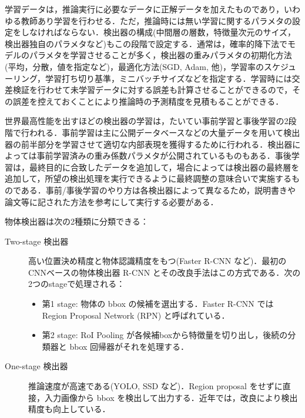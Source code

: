 \documentclass[originalpaper,fleqn]{jsaiart}     %
\begin{document}
学習データは，推論実行に必要なデータに正解データを加えたものであり，いわゆる教師あり学習を行わせる．ただ，推論時には無い学習に関するパラメタの設定をしなければならない．検出器の構成(中間層の層数，特徴量次元のサイズ，検出器独自のパラメタなど)もこの段階で設定する．通常は，確率的降下法でモデルのパラメタを学習させることが多く，検出器の重みパラメタの初期化方法(平均，分散，値を指定など)，最適化方法(SGD, Adam, 他)，学習率のスケジューリング，学習打ち切り基準，ミニバッチサイズなどを指定する．学習時には交差検証を行わせて未学習データに対する誤差も計算させることができるので，その誤差を控えておくことにより推論時の予測精度を見積もることができる．

世界最高性能を出すほどの検出器の学習は，たいてい事前学習と事後学習の2段階で行われる．事前学習は主に公開データベースなどの大量データを用いて検出器の前半部分を学習させて適切な内部表現を獲得するために行われる．検出器によっては事前学習済みの重み係数パラメタが公開されているものもある．事後学習は，最終目的に合致したデータを追加して，場合によっては検出器の最終層を追加して，所望の検出処理を実行できるように最終調整の意味合いで実施するものである．事前/事後学習のやり方は各検出器によって異なるため，説明書きや論文等に記された方法を参考にして実行する必要がある．

物体検出器は次の2種類に分類できる\cite{JZLYLFQ19}：
\begin{description}
    \item[Two-stage 検出器] 高い位置決め精度と物体認識精度をもつ(Faster R-CNN など)．最初のCNNベースの物体検出器 R-CNN とその改良手法はこの方式である．次の2つのstageで処理される：
    \begin{itemize}
        \item 第1 stage: 物体の bbox の候補を選出する．Faster R-CNN では Region Proposal Network (RPN) と呼ばれている．
        \item 第2 stage: RoI Pooling が各候補boxから特徴量を切り出し，後続の分類器と bbox 回帰器がそれを処理する．
    \end{itemize}
    \item[One-stage 検出器] 推論速度が高速である(YOLO, SSD\cite{LAESRFB16} など)．Region proposal をせずに直接，入力画像から bbox を検出して出力する．近年では，改良により検出精度も向上している．
\end{description}
\end{document}
